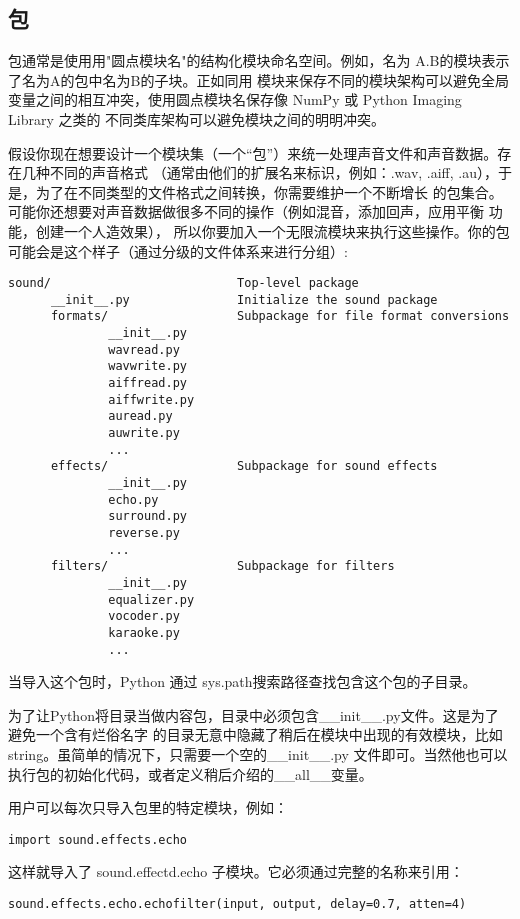 \documentclass[UTF8]{ctexart}
\begin{document}
\subsection{包}
包通常是使用用"圆点模块名"的结构化模块命名空间。例如，名为 A.B的模块表示了名为A的包中名为B的子块。正如同用
模块来保存不同的模块架构可以避免全局变量之间的相互冲突，使用圆点模块名保存像 NumPy 或 Python Imaging Library
之类的 不同类库架构可以避免模块之间的明明冲突。

假设你现在想要设计一个模块集（一个``包''）来统一处理声音文件和声音数据。存在几种不同的声音格式
（通常由他们的扩展名来标识，例如：.wav, .aiff, .au），于是，为了在不同类型的文件格式之间转换，你需要维护一个不断增长
的包集合。可能你还想要对声音数据做很多不同的操作（例如混音，添加回声，应用平衡 功能，创建一个人造效果），
所以你要加入一个无限流模块来执行这些操作。你的包可能会是这个样子（通过分级的文件体系来进行分组）:
\begin{verbatim}
sound/                          Top-level package
      __init__.py               Initialize the sound package
      formats/                  Subpackage for file format conversions
              __init__.py
              wavread.py
              wavwrite.py
              aiffread.py
              aiffwrite.py
              auread.py
              auwrite.py
              ...
      effects/                  Subpackage for sound effects
              __init__.py
              echo.py
              surround.py
              reverse.py
              ...
      filters/                  Subpackage for filters
              __init__.py
              equalizer.py
              vocoder.py
              karaoke.py
              ...
\end{verbatim}

当导入这个包时，Python 通过 sys.path搜索路径查找包含这个包的子目录。

为了让Python将目录当做内容包，目录中必须包含\_\_init\_\_.py文件。这是为了避免一个含有烂俗名字
的目录无意中隐藏了稍后在模块中出现的有效模块，比如string。虽简单的情况下，只需要一个空的\_\_init\_\_.py
文件即可。当然他也可以执行包的初始化代码，或者定义稍后介绍的\_\_all\_\_变量。

用户可以每次只导入包里的特定模块，例如：
\begin{verbatim}
import sound.effects.echo
\end{verbatim}

这样就导入了 sound.effectd.echo 子模块。它必须通过完整的名称来引用：
\begin{verbatim}
sound.effects.echo.echofilter(input, output, delay=0.7, atten=4)
\end{verbatim}
\end{document}
